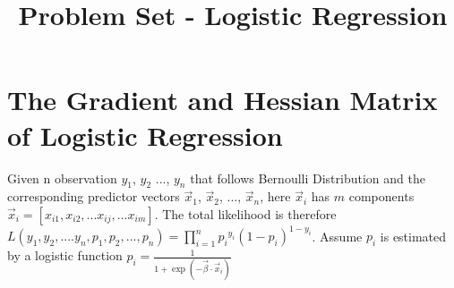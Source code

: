 \documentclass{article}
\title{Problem Set - Logistic Regression} %
\begin{document}
\maketitle %
\thispagestyle{fancy}
\pagestyle{fancy}

\section{The Gradient and Hessian Matrix of Logistic Regression}
Given n observation $y_1$, $y_2$ ..., $y_n$ that follows Bernoulli Distribution and the corresponding predictor vectors $\vec{x}_1$, $\vec{x}_2$, ..., $\vec{x}_n$, here $\vec{x}_{i}$ has $m$ components $\vec{x}_{i}=[x_{i1}, x_{i2}, ...x_{ij}, ...x_{im}]$. The total likelihood is therefore $L(y_1, y_2, .... y_n, p_1, p_2, ... ,p_n)=\prod\limits_{i=1}^n {p_i}^{y_i} (1-p_i)^{1-y_i}$. Assume $p_i$ is estimated by a logistic function $p_i=\frac{1}{1+\exp(-\vec{\beta}\cdot{\vec{x}_i})}$
\end{document}
